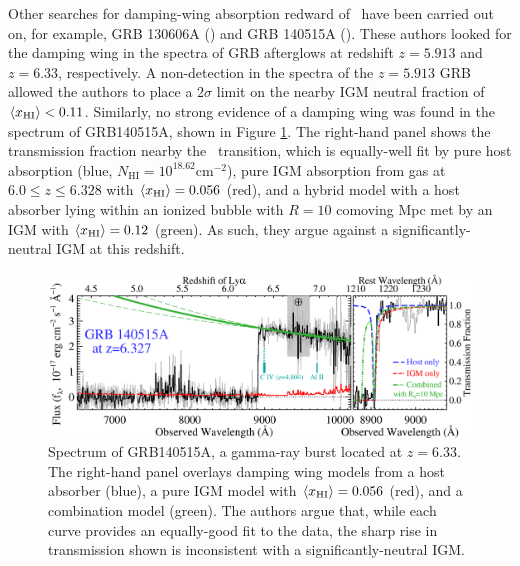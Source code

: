 Other searches for damping-wing absorption redward of \lya\ have been carried out on, for example, GRB 130606A (\citealt{Chornock:2013una}) and GRB 140515A (\citealt{Chornock:2014fva}). These authors looked for the damping wing in the spectra of GRB afterglows at redshift $z = 5.913$ and $z = 6.33$, respectively. A non-detection in the spectra of the $z = 5.913$ GRB allowed the authors to place a $2\sigma$ limit on the nearby IGM neutral fraction of $\langle x_{\text{HI}}\rangle < 0.11$. Similarly, no strong evidence of a damping wing was found in the spectrum of GRB140515A, shown in Figure \ref{fig:GRB140515A}. The right-hand panel shows the transmission fraction nearby the \lya\ transition, which is equally-well fit by pure host absorption (blue, $N_{\text{HI}} = 10^{18.62}\text{cm}^{-2}$), pure IGM absorption from gas at $6.0 \leq z \leq 6.328$ with $\langle x_{\text{HI}}\rangle = 0.056$ (red), and a hybrid model with a host absorber lying within an ionized bubble with $R = 10$ comoving Mpc met by an IGM with $\langle x_{\text{HI}}\rangle = 0.12$ (green). As such, they argue against a significantly-neutral IGM at this redshift.  

\begin{figure}[!p]
  \centering
  \includegraphics[width=14cm]{GRB140515A.eps}
  \caption{Spectrum of GRB140515A, a gamma-ray burst located at $z = 6.33$. The right-hand panel overlays damping wing models from a host absorber (blue), a pure IGM model with $\langle x_{\text{HI}}\rangle = 0.056$ (red), and a combination model (green). The authors argue that, while each curve provides an equally-good fit to the data, the sharp rise in transmission shown is inconsistent with a significantly-neutral IGM. }
  \label{fig:GRB140515A}
\end{figure}


